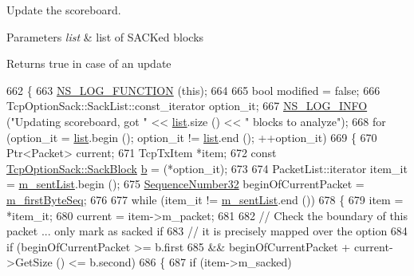 Update the scoreboard. 


\begin{DoxyParams}{Parameters}
{\em list} & list of S\+A\+C\+Ked blocks \\
\hline
\end{DoxyParams}
\begin{DoxyReturn}{Returns}
true in case of an update 
\end{DoxyReturn}

\begin{DoxyCode}
662 \{
663   \hyperlink{log-macros-disabled_8h_a90b90d5bad1f39cb1b64923ea94c0761}{NS\_LOG\_FUNCTION} (\textcolor{keyword}{this});
664 
665   \textcolor{keywordtype}{bool} modified = \textcolor{keyword}{false};
666   TcpOptionSack::SackList::const\_iterator option\_it;
667   \hyperlink{group__logging_gafbd73ee2cf9f26b319f49086d8e860fb}{NS\_LOG\_INFO} (\textcolor{stringliteral}{"Updating scoreboard, got "} << \hyperlink{openflow-interface_8h_afd9bcfa176617760671b67580f536fa7}{list}.size () << \textcolor{stringliteral}{" blocks to analyze"});
668   \textcolor{keywordflow}{for} (option\_it = \hyperlink{openflow-interface_8h_afd9bcfa176617760671b67580f536fa7}{list}.begin (); option\_it != \hyperlink{openflow-interface_8h_afd9bcfa176617760671b67580f536fa7}{list}.end (); ++option\_it)
669     \{
670       Ptr<Packet> current;
671       TcpTxItem *item;
672       \textcolor{keyword}{const} \hyperlink{classns3_1_1TcpOptionSack_a9e1d07d8729fd3ac5ead7305794675c3}{TcpOptionSack::SackBlock} \hyperlink{buildings__pathloss_8m_a21ad0bd836b90d08f4cf640b4c298e7c}{b} = (*option\_it);
673 
674       PacketList::iterator item\_it = \hyperlink{classns3_1_1TcpTxBuffer_ae131f4743f4537f3606db664874440e5}{m\_sentList}.begin ();
675       \hyperlink{group__network_gacb2070e4e98d2d5135c9bede58f07a03}{SequenceNumber32} beginOfCurrentPacket = \hyperlink{classns3_1_1TcpTxBuffer_a46b67e5cb3396b43a41dd3fd5b135346}{m\_firstByteSeq};
676 
677       \textcolor{keywordflow}{while} (item\_it != \hyperlink{classns3_1_1TcpTxBuffer_ae131f4743f4537f3606db664874440e5}{m\_sentList}.end ())
678         \{
679           item = *item\_it;
680           current = item->m\_packet;
681 
682           \textcolor{comment}{// Check the boundary of this packet ... only mark as sacked if}
683           \textcolor{comment}{// it is precisely mapped over the option}
684           \textcolor{keywordflow}{if} (beginOfCurrentPacket >= b.first
685               && beginOfCurrentPacket + current->GetSize () <= b.second)
686             \{
687               \textcolor{keywordflow}{if} (item->m\_sacked)

\end{DoxyCode}
